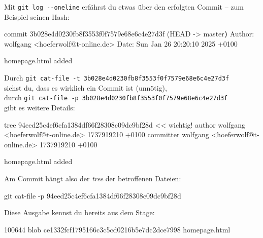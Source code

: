 \documentclass[
  letterpaper,
  DIV=11]{scrreprt}
\newenvironment{Shaded}{\begin{snugshade}}{\end{snugshade}}
\newcommand{\AttributeTok}[1]{\textcolor[rgb]{0.40,0.45,0.13}{#1}}
\newcommand{\ErrorTok}[1]{\textcolor[rgb]{0.68,0.00,0.00}{#1}}
\newcommand{\ExtensionTok}[1]{\textcolor[rgb]{0.00,0.23,0.31}{#1}}
\newcommand{\FunctionTok}[1]{\textcolor[rgb]{0.28,0.35,0.67}{#1}}
\newcommand{\KeywordTok}[1]{\textcolor[rgb]{0.00,0.23,0.31}{\textbf{#1}}}
\newcommand{\NormalTok}[1]{\textcolor[rgb]{0.00,0.23,0.31}{#1}}
\newcommand{\OperatorTok}[1]{\textcolor[rgb]{0.37,0.37,0.37}{#1}}
\newcommand{\StringTok}[1]{\textcolor[rgb]{0.13,0.47,0.30}{#1}}
\begin{document}
Mit \texttt{git\ log\ -\/-oneline} erfährst du etwas über den erfolgten
Commit -- zum Beispiel seinen Hash:

\begin{Shaded}
\begin{Highlighting}[]
\ExtensionTok{commit}\NormalTok{ 3b028e4d0230fb8f3553f0f7579e68e6c4e27d3f }\ErrorTok{(}\ExtensionTok{HEAD} \AttributeTok{{-}}\OperatorTok{\textgreater{}}\NormalTok{ master}\KeywordTok{)}
\ExtensionTok{Author:}\NormalTok{ wolfgang }\OperatorTok{\textless{}}\NormalTok{hoeferwolf@t{-}online.de}\OperatorTok{\textgreater{}}
\ExtensionTok{Date:}\NormalTok{   Sun Jan 26 20:20:10 2025 +0100}

    \ExtensionTok{homepage.html}\NormalTok{ added}
\end{Highlighting}
\end{Shaded}

Durch
\texttt{git\ cat-file\ -t\ 3b028e4d0230fb8f3553f0f7579e68e6c4e27d3f}\\
siehst du, dass es wirklich ein Commit ist (unnötig),\\
durch
\texttt{git\ cat-file\ -p\ 3b028e4d0230fb8f3553f0f7579e68e6c4e27d3f}\\
gibt es weitere Details:

\begin{Shaded}
\begin{Highlighting}[]
\ExtensionTok{tree}\NormalTok{ 94eed25c4ef6cfa1384df66f28308c09dc9bf28d   }\OperatorTok{\textless{}\textless{} wichtig!}
\StringTok{author wolfgang \textless{}hoeferwolf@t{-}online.de\textgreater{} 1737919210 +0100}
\StringTok{committer wolfgang \textless{}hoeferwolf@t{-}online.de\textgreater{} 1737919210 +0100}

\StringTok{homepage.html added}
\end{Highlighting}
\end{Shaded}

Am Commit hängt also der \emph{tree} der betroffenen Dateien:

\begin{Shaded}
\begin{Highlighting}[]
\FunctionTok{git}\NormalTok{ cat{-}file }\AttributeTok{{-}p}\NormalTok{ 94eed25c4ef6cfa1384df66f28308c09dc9bf28d}
\end{Highlighting}
\end{Shaded}

Diese Ausgabe kennst du bereits aus dem Stage:

\begin{Shaded}
\begin{Highlighting}[]
\ExtensionTok{100644}\NormalTok{ blob ce1332fcf1795166c3c5cd0216b5e7dc2dce7998    homepage.html}
\end{Highlighting}
\end{Shaded}
\end{document}
